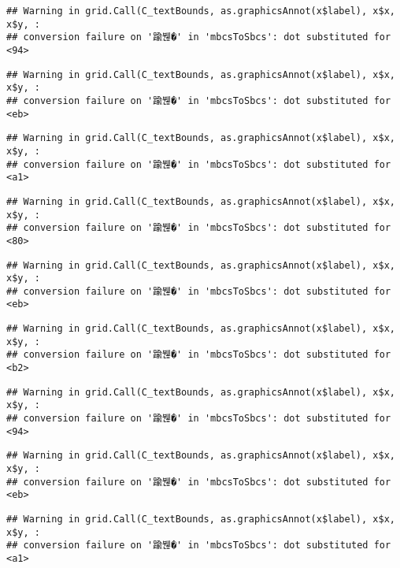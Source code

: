 \documentclass[
]{article}
\begin{document}
\begin{verbatim}
## Warning in grid.Call(C_textBounds, as.graphicsAnnot(x$label), x$x, x$y, :
## conversion failure on '踰붾�' in 'mbcsToSbcs': dot substituted for <94>
\end{verbatim}

\begin{verbatim}
## Warning in grid.Call(C_textBounds, as.graphicsAnnot(x$label), x$x, x$y, :
## conversion failure on '踰붾�' in 'mbcsToSbcs': dot substituted for <eb>
\end{verbatim}

\begin{verbatim}
## Warning in grid.Call(C_textBounds, as.graphicsAnnot(x$label), x$x, x$y, :
## conversion failure on '踰붾�' in 'mbcsToSbcs': dot substituted for <a1>
\end{verbatim}

\begin{verbatim}
## Warning in grid.Call(C_textBounds, as.graphicsAnnot(x$label), x$x, x$y, :
## conversion failure on '踰붾�' in 'mbcsToSbcs': dot substituted for <80>
\end{verbatim}

\begin{verbatim}
## Warning in grid.Call(C_textBounds, as.graphicsAnnot(x$label), x$x, x$y, :
## conversion failure on '踰붾�' in 'mbcsToSbcs': dot substituted for <eb>
\end{verbatim}

\begin{verbatim}
## Warning in grid.Call(C_textBounds, as.graphicsAnnot(x$label), x$x, x$y, :
## conversion failure on '踰붾�' in 'mbcsToSbcs': dot substituted for <b2>
\end{verbatim}

\begin{verbatim}
## Warning in grid.Call(C_textBounds, as.graphicsAnnot(x$label), x$x, x$y, :
## conversion failure on '踰붾�' in 'mbcsToSbcs': dot substituted for <94>
\end{verbatim}

\begin{verbatim}
## Warning in grid.Call(C_textBounds, as.graphicsAnnot(x$label), x$x, x$y, :
## conversion failure on '踰붾�' in 'mbcsToSbcs': dot substituted for <eb>
\end{verbatim}

\begin{verbatim}
## Warning in grid.Call(C_textBounds, as.graphicsAnnot(x$label), x$x, x$y, :
## conversion failure on '踰붾�' in 'mbcsToSbcs': dot substituted for <a1>
\end{verbatim}
\end{document}
